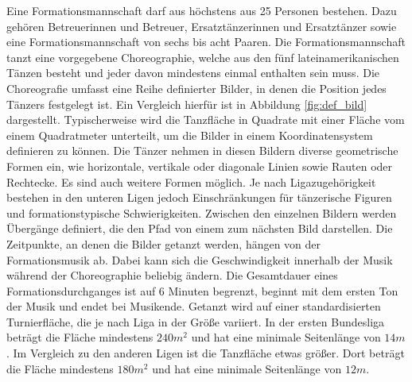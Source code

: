 \documentclass[
  ngerman,
  a4paper,  %
  twoside,  %
  bibliography=totoc,
  headsepline,
  cleardoublepage=empty,
  parskip=half,
  draft=false
]{scrbook}
\begin{document}
Eine Formationsmannschaft darf aus höchstens aus 25 Personen bestehen.
Dazu gehören Betreuerinnen und Betreuer, Ersatztänzerinnen und Ersatztänzer sowie eine Formationsmannschaft von sechs bis acht Paaren.
Die Formationsmannschaft tanzt eine vorgegebene Choreographie, welche aus den fünf lateinamerikanischen Tänzen besteht und jeder davon mindestens einmal enthalten sein muss.
Die Choreografie umfasst eine Reihe definierter Bilder, in denen die Position jedes Tänzers festgelegt ist.
Ein Vergleich hierfür ist in Abbildung \ref{fig:def_bild} dargestellt.
Typischerweise wird die Tanzfläche in Quadrate mit einer Fläche vom einem Quadratmeter unterteilt, um die Bilder in einem Koordinatensystem definieren zu können.
Die Tänzer nehmen in diesen Bildern diverse geometrische Formen ein, wie horizontale, vertikale oder diagonale Linien sowie Rauten oder Rechtecke.
Es sind auch weitere Formen möglich.
Je nach Ligazugehörigkeit bestehen in den unteren Ligen jedoch Einschränkungen für tänzerische Figuren und formationstypische Schwierigkeiten.
Zwischen den einzelnen Bildern werden Übergänge definiert, die den Pfad von einem zum nächsten Bild darstellen.
Die Zeitpunkte, an denen die Bilder getanzt werden, hängen von der Formationsmusik ab.
Dabei kann sich die Geschwindigkeit innerhalb der Musik während der Choreographie beliebig ändern.
Die Gesamtdauer eines Formationsdurchganges ist auf 6 Minuten begrenzt, beginnt mit dem ersten Ton der Musik und endet bei Musikende.
Getanzt wird auf einer standardisierten Turnierfläche, die je nach Liga in der Größe variiert.
In der ersten Bundesliga beträgt die Fläche mindestens $240 m^2$ und hat eine minimale Seitenlänge von $14 m$.
Im Vergleich zu den anderen Ligen ist die Tanzfläche etwas größer.
Dort beträgt die Fläche mindestens $180 m^2$ und hat eine minimale Seitenlänge von $12 m$.


\end{document}
